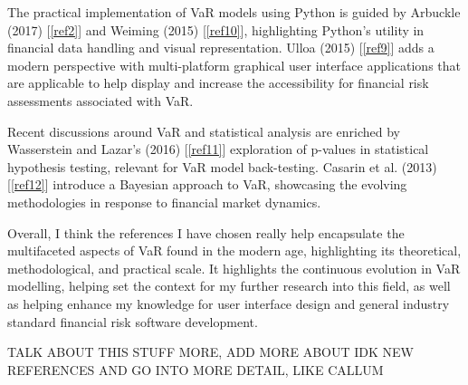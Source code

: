 \documentclass{article}
\begin{document}
The practical implementation of VaR models using Python is guided by Arbuckle (2017) [\ref{ref2}] and Weiming (2015) [\ref{ref10}], highlighting Python's utility in financial data handling and visual representation. Ulloa (2015) [\ref{ref9}]  adds a modern perspective with multi-platform graphical user interface applications that are applicable to help display and increase the accessibility for financial risk assessments associated with VaR.\\\vspace{0.3cm}

Recent discussions around VaR and statistical analysis are enriched by Wasserstein and Lazar's (2016) [\ref{ref11}] exploration of p-values in statistical hypothesis testing, relevant for VaR model back-testing. Casarin et al. (2013) [\ref{ref12}] introduce a Bayesian approach to VaR, showcasing the evolving methodologies in response to financial market dynamics.\\\vspace{0.3cm}

Overall, I think the references I have chosen really help encapsulate the multifaceted aspects of VaR found in the modern age, highlighting its theoretical, methodological, and practical scale. It highlights the continuous evolution in VaR modelling, helping set the context for my further research into this field, as well as helping enhance my knowledge for user interface design and general industry standard financial risk software development.

TALK ABOUT THIS STUFF MORE, ADD MORE ABOUT IDK NEW REFERENCES AND GO INTO MORE DETAIL, LIKE CALLUM

\end{document}
